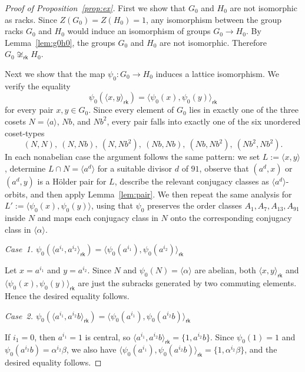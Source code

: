 \documentclass[10pt,a4paper]{amsart}
\begin{document}
\begin{proof}[Proof of Proposition~\ref{prop:ex}]
  First we show that $G_0$ and $H_0$ are not isomorphic as racks. Since $Z(G_0)=Z(H_0)=1$, any isomorphism between the group racks $G_0$ and $H_0$ would induce an isomorphism of groups $G_0\to H_0$. By Lemma~\ref{lem:g0h0}, the groups $G_0$ and $H_0$ are not isomorphic. Therefore $G_0\not\cong_{\mathsf{rk}} H_0$.

  Next we show that the map $\psi_0\colon G_0\to H_0$ induces a lattice isomorphism. We verify the equality
  $$ \psi_0(\langle x,y\rangle_{\mathsf{rk}}) = \langle \psi_0(x),\psi_0(y)\rangle_{\mathsf{rk}} $$
  for every pair $x,y\in G_0$. Since every element of $G_0$ lies in exactly one of the three cosets $N=\langle a\rangle$, $Nb$, and $Nb^2$, every pair falls into exactly one of the six unordered coset-types
  $$ (N,N),\ (N,Nb),\ (N,Nb^2),\ (Nb,Nb),\ (Nb,Nb^2),\ (Nb^2,Nb^2). $$
  In each nonabelian case the argument follows the same pattern: we set $L:=\langle x,y\rangle$, determine $L\cap N=\langle a^d\rangle$ for a suitable divisor $d$ of $91$, observe that $(a^d,x)$ or $(a^d,y)$ is a Hölder pair for $L$, describe the relevant conjugacy classes as $\langle a^d\rangle$-orbits, and then apply Lemma~\ref{lem:pair}. We then repeat the same analysis for $L':=\langle \psi_0(x),\psi_0(y)\rangle$, using that $\psi_0$ preserves the order classes $A_1,A_7,A_{13},A_{91}$ inside $N$ and maps each conjugacy class in $N$ onto the corresponding conjugacy class in $\langle \alpha\rangle$.

  \medskip
  \noindent
  \emph{Case~1.\; $\psi_0(\langle a^{i_1},a^{i_2}\rangle_{\mathsf{rk}}) = \langle \psi_0(a^{i_1}),\psi_0(a^{i_2})\rangle_{\mathsf{rk}}$}

  \medskip
  Let $x=a^{i_1}$ and $y=a^{i_2}$. Since $N$ and $\psi_0(N)=\langle\alpha\rangle$ are abelian, both $\langle x,y\rangle_{\mathsf{rk}}$ and $\langle \psi_0(x),\psi_0(y)\rangle_{\mathsf{rk}}$ are just the subracks generated by two commuting elements. Hence the desired equality follows.
  
  
  \medskip
  \noindent
  \emph{Case~2.\; $\psi_0(\langle a^{i_1},a^{i_2}b\rangle_{\mathsf{rk}})=\langle \psi_0(a^{i_1}),\psi_0(a^{i_2}b)\rangle_{\mathsf{rk}}$}
  
  \medskip
  If $i_1=0$, then $a^{i_1}=1$ is central, so $\langle a^{i_1},a^{i_2}b\rangle_{\mathsf{rk}}=\{1,a^{i_2}b\}$. Since $\psi_0(1)=1$ and $\psi_0(a^{i_2}b)=\alpha^{i_2}\beta$, we also have $\langle \psi_0(a^{i_1}),\psi_0(a^{i_2}b)\rangle_{\mathsf{rk}}=\{1,\alpha^{i_2}\beta\}$, and the desired equality follows.
  

\end{proof}
\end{document}
